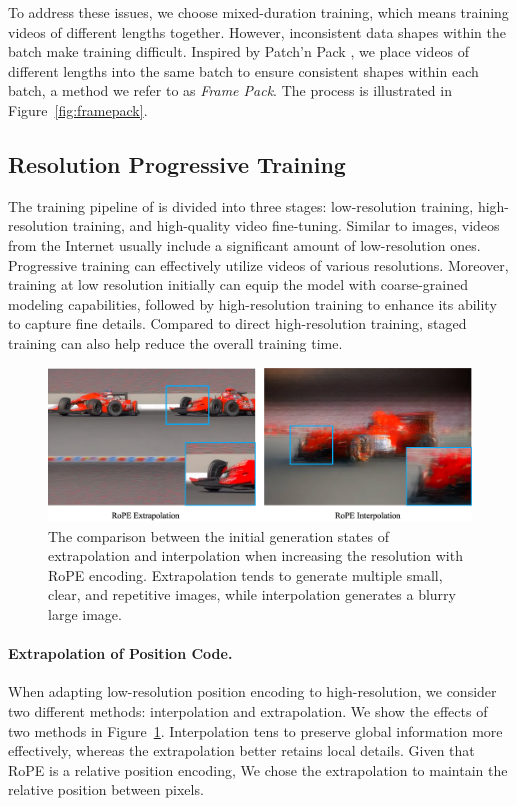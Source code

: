 To address these issues, we choose mixed-duration training, which means training videos of different lengths together. 
However, inconsistent data shapes within the batch make training difficult. 
Inspired by Patch'n Pack \citep{dehghani2024patch}, we place videos of different lengths into the same batch to ensure consistent shapes within each batch, a method we refer to as \textit{Frame Pack}. The process is illustrated in Figure~\ref{fig:framepack}. 

\subsection{Resolution Progressive Training}

The training pipeline of \model is divided into three stages: low-resolution training, high-resolution training, and high-quality video fine-tuning. 
Similar to images, videos from the Internet usually include a significant amount of low-resolution ones. 
Progressive training can effectively utilize videos of various resolutions. 
Moreover, training at low resolution initially can equip the model with coarse-grained modeling capabilities, followed by high-resolution training to enhance its ability to capture fine details. 
Compared to direct high-resolution training, staged training can also help reduce the overall training time.

\begin{figure}[h]
\begin{center}
\includegraphics[width=0.9\linewidth]{images/ive.jpg}
\end{center}
\caption{The comparison between the initial generation states of extrapolation and interpolation when increasing the resolution with RoPE encoding. Extrapolation tends to generate multiple small, clear, and repetitive images, while interpolation generates a blurry large image.}
\label{fig:ive}
\end{figure}

\paragraph{Extrapolation of Position Code.}
When adapting low-resolution position encoding to high-resolution, we consider two different methods: interpolation and extrapolation. We show the effects of two methods in Figure~\ref{fig:ive}. Interpolation tens to preserve global information more effectively, whereas the extrapolation better retains local details. Given that RoPE is a relative position encoding, We chose the extrapolation to maintain the relative position between pixels. 

